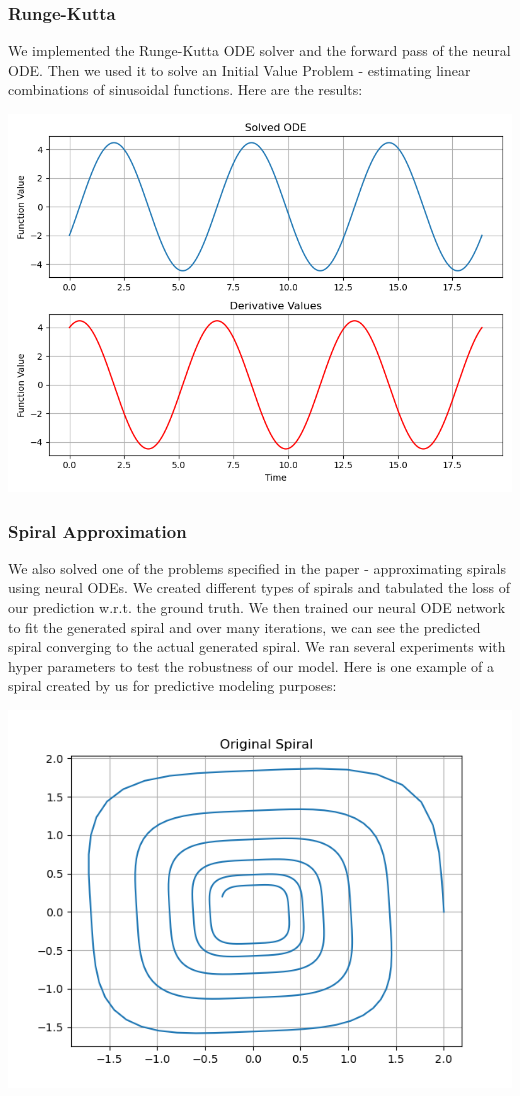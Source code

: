 \documentclass{article}
\begin{document}
\subsubsection{Runge-Kutta}
We implemented the Runge-Kutta ODE solver and the forward pass of the neural ODE. Then we used it to solve an Initial Value Problem - estimating linear combinations of sinusoidal functions. Here are the results:

\includegraphics[width = \linewidth]{icml files/exp1.png}

\subsubsection{Spiral Approximation}
We also solved one of the problems specified in the paper - approximating spirals using neural ODEs. We created different types of spirals and tabulated the loss of our prediction w.r.t. the ground truth. We then trained our neural ODE network to fit the generated spiral and over many iterations, we can see the predicted spiral converging to the actual generated spiral. We ran several experiments with hyper parameters to test the robustness of our model. Here is one example of a spiral created by us for predictive modeling purposes:

\includegraphics[width = \linewidth]{icml files/orig_spiral.png}
\end{document}
